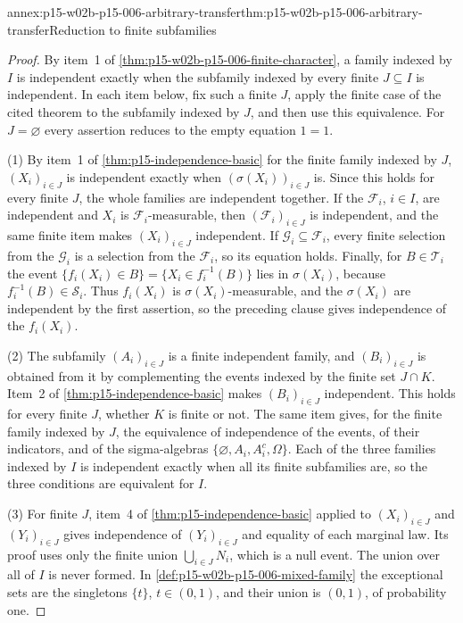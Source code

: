 \begin{annexitem}{annex:p15-w02b-p15-006-arbitrary-transfer}{thm:p15-w02b-p15-006-arbitrary-transfer}{Reduction to finite subfamilies}
\begin{proof}
By item~1 of \cref{thm:p15-w02b-p15-006-finite-character}, a family
indexed by \(I\) is independent exactly when the subfamily indexed by
every finite \(J\subseteq I\) is independent. In each item below, fix
such a finite \(J\), apply the finite case of the cited theorem to the
subfamily indexed by \(J\), and then use this equivalence. For
\(J=\varnothing\) every assertion reduces to the empty equation
\(1=1\).

(1) By item~1 of \cref{thm:p15-independence-basic} for the finite family
indexed by \(J\), \((X_i)_{i\in J}\) is independent exactly when
\((\sigma(X_i))_{i\in J}\) is. Since this holds for every finite \(J\),
the whole families are independent together. If the
\(\mathcal F_i\), \(i\in I\), are independent and \(X_i\) is
\(\mathcal F_i\)-measurable, then \((\mathcal F_i)_{i\in J}\) is
independent, and the same finite item makes \((X_i)_{i\in J}\)
independent. If \(\mathcal G_i\subseteq\mathcal F_i\), every finite
selection from the \(\mathcal G_i\) is a selection from the
\(\mathcal F_i\), so its equation holds. Finally, for
\(B\in\mathcal T_i\) the event
\(\{f_i(X_i)\in B\}=\{X_i\in f_i^{-1}(B)\}\) lies in \(\sigma(X_i)\),
because \(f_i^{-1}(B)\in\mathcal S_i\). Thus \(f_i(X_i)\) is
\(\sigma(X_i)\)-measurable, and the \(\sigma(X_i)\) are independent by
the first assertion, so the preceding clause gives independence of the
\(f_i(X_i)\).

(2) The subfamily \((A_i)_{i\in J}\) is a finite independent family,
and \((B_i)_{i\in J}\) is obtained from it by complementing the events
indexed by the finite set \(J\cap K\). Item~2 of
\cref{thm:p15-independence-basic} makes \((B_i)_{i\in J}\) independent.
This holds for every finite \(J\), whether \(K\) is finite or not. The
same item gives, for the finite family indexed by \(J\), the equivalence
of independence of the events, of their indicators, and of the
sigma-algebras \(\{\varnothing,A_i,A_i^c,\Omega\}\). Each of the three
families indexed by \(I\) is independent exactly when all its finite
subfamilies are, so the three conditions are equivalent for \(I\).

(3) For finite \(J\), item~4 of \cref{thm:p15-independence-basic}
applied to \((X_i)_{i\in J}\) and \((Y_i)_{i\in J}\) gives independence
of \((Y_i)_{i\in J}\) and equality of each marginal law. Its proof uses
only the finite union \(\bigcup_{i\in J}N_i\), which is a null event.
The union over all of \(I\) is never formed. In
\cref{def:p15-w02b-p15-006-mixed-family} the exceptional sets are the
singletons \(\{t\}\), \(t\in(0,1)\), and their union is \((0,1)\), of
probability one.


\end{proof}
\end{annexitem}
